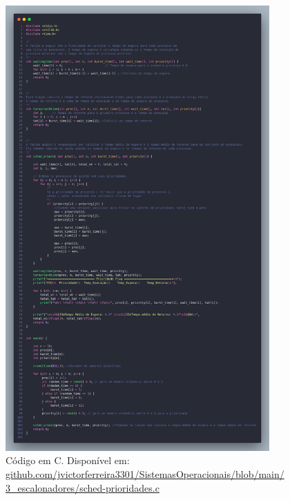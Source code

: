 \documentclass[
	12pt,				%
	openright,			%
	oneside,			%
	a4paper,			%
	chapter=TITLE,		%
	english,			%
	french,				%
	spanish,			%
	brazil				%
	]{abntex2}
\theoremstyle{definition}
\begin{document}
\begin{figure}[H]
    \centering
    \includegraphics[width=0.9\textwidth]{imagens/prioridades_src.png}
    \caption{Código em C. Disponível em: \href{https://github.com/jvictorferreira3301/Sistemas_Operacionais/blob/main/3_escalonadores/sched-prioridades.c}{github.com/jvictorferreira3301/SistemasOperacionais/blob/main/
    3\_escalonadores/sched-prioridades.c}}
    \label{fig:prioridades}
\end{figure}
\end{document}
